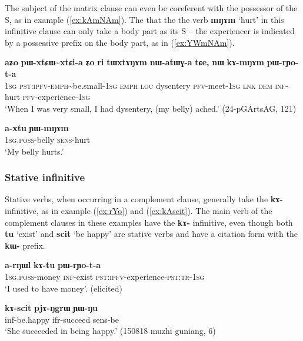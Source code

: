 \documentclass[oneside,a4paper,11pt]{article}
\newcommand{\ipa}[1]{\textbf{\phon#1}} %
\newcommand{\jpg}[2]{\ipa{#1} `#2'} %
\newcommand{\tld}{\textasciitilde{}}
\begin{document}
The subject of the matrix clause can even be coreferent with the possessor of the S, as in example (\ref{ex:kAmNAm}). The that the the verb \ipa{mŋɤm} `hurt' in this infinitive clause can only take a body part as its S -- the experiencer is indicated by a possessive prefix on the body part, as in (\ref{ex:YWmNAm}).
 
 \begin{exe}
\ex \label{ex:kAmNAm}
\gll \ipa{aʑo} 	\ipa{pɯ-xtɕɯ\tld{}xtɕi-a} 	\ipa{ʑo} 	\ipa{ri} 	\ipa{tɯxtɤŋɤm} 	\ipa{nɯ-atɯɣ-a} 	\ipa{tɕe,} 	\ipa{nɯ} 	\ipa{kɤ-mŋɤm} 	\ipa{pɯ-rɲo-t-a} \\
\textsc{1sg} \textsc{pst:ipfv-emph}\tld{}be.small-\textsc{1sg} \textsc{emph} \textsc{loc} dysentery \textsc{pfv}-meet-\textsc{1sg} \textsc{lnk} \textsc{dem} \textsc{inf}-hurt \textsc{pfv}-experience-\textsc{1sg} \\
\glt `When I was very small, I had dysentery, (my belly) ached.'  (24-pGArtsAG, 121)
\end{exe}

 \begin{exe}
\ex \label{ex:YWmNAm}
\gll \ipa{a-xtu} 	\ipa{ɲɯ-mŋɤm} \\
\textsc{1sg.poss}-belly \textsc{sens}-hurt \\
\glt `My belly hurts.' 
\end{exe}
 
 \subsubsection{Stative infinitive} \label{sec:stative.inf}
Stative verbs, when occurring in a complement clause, generally take the \ipa{kɤ-} infinitive, as in example  (\ref{ex:rYo}) and (\ref{ex:kAscit}). The main verb of the complement clauses in these examples have the \ipa{kɤ-} infinitive, even though both \jpg{tu}{exist} and \jpg{scit}{be happy} are stative verbs and have a citation form with the \ipa{kɯ-} prefix.

\begin{exe}
\ex \label{ex:rYo}
\gll \ipa{a-rŋɯl} 	\ipa{kɤ-tu} 	\ipa{pɯ-rɲo-t-a} \\
\textsc{1sg.poss}-money \textsc{inf}-exist \textsc{pst:ipfv}-experience-\textsc{pst:tr-1sg} \\
\glt `I used to have money'. (elicited)
\end{exe}

\begin{exe}
\ex \label{ex:kAscit}
 \gll \ipa{kɤ-scit} 	\ipa{pjɤ-ŋgrɯ} 	\ipa{ɲɯ-ŋu}  \\
 inf-be.happy ifr-succeed sens-be \\
 \glt `She succeeded in being happy.' (150818 muzhi guniang, 6)
 \end{exe} 
 
\end{document}
